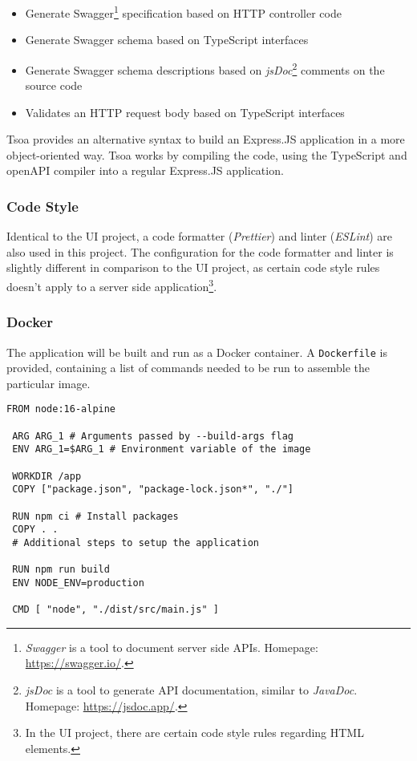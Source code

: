    \begin{itemize}
    \item Generate Swagger\footnote{\emph{Swagger} is a tool to document server side APIs. Homepage: \url{https://swagger.io/}.} specification based on HTTP controller code
    \item Generate Swagger schema based on TypeScript interfaces
    \item Generate Swagger schema descriptions based on \emph{jsDoc}\footnote{\emph{jsDoc} is a tool to generate API documentation, similar to \emph{JavaDoc}. Homepage: \url{https://jsdoc.app/}.} comments on the source code
    \item Validates an HTTP request body based on TypeScript interfaces
   \end{itemize}
  
  Tsoa provides an alternative syntax to build an Express.JS application in a more object-oriented way. Tsoa works by compiling the code, using the TypeScript and openAPI compiler into a regular Express.JS application. 

  \subsubsection{Code Style}
  Identical to the UI project, a code formatter (\emph{Prettier}) and linter (\emph{ESLint}) are also used in this project. The configuration for the code formatter and linter is slightly different in comparison to the UI project, as certain code style rules doesn't apply to a server side application\footnote{In the UI project, there are certain code style rules regarding HTML elements.}.

  \subsubsection{Docker}
  The application will be built and run as a Docker container. A \verb;Dockerfile; is provided, containing a list of commands needed to be run to assemble the particular image.

   \begin{lstlisting}[caption={Dockerfile for FDS (Docker)}, language=docker]
 FROM node:16-alpine

 ARG ARG_1 # Arguments passed by --build-args flag
 ENV ARG_1=$ARG_1 # Environment variable of the image

 WORKDIR /app
 COPY ["package.json", "package-lock.json*", "./"]

 RUN npm ci # Install packages
 COPY . .
 # Additional steps to setup the application

 RUN npm run build
 ENV NODE_ENV=production

 CMD [ "node", "./dist/src/main.js" ]
   \end{lstlisting}
  

